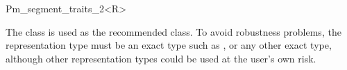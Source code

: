 
\ccRefPageBegin


\begin{ccRefClass}{Pm_segment_traits_2<R>}
    
\ccDefinition 
    The class 
    is used as the recommended class. To avoid robustness problems, 
    the representation type  must be an exact type such as
    ,
     or any other exact type,
    although other representation types could be used at the user's own risk.

 
\ccIsModel

    


     
 
\end{ccRefClass} %

\ccRefPageEnd
